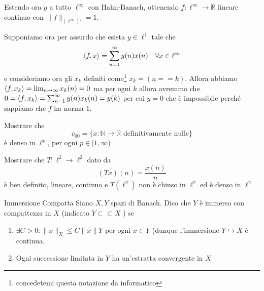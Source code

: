     Estendo ora \(g\) a tutto \(\ell^{\infty}\) con Hahn-Banach, ottenendo \(f :
    \ell^{\infty} \to \mathbb{R}\) lineare continuo con \(\|f\|_{(\ell^{\infty})'} = 1 \).

    Supponiamo ora per assurdo che esista \(y \in \ell^{1}\) tale che
    \[
      {\left\langle f, x\right\rangle} = \sum_{n=1}^{\infty} y{(n)}x{(n)} \quad \forall x \in \ell^{\infty} 
    \]
    e consideriamo ora gli \(x_k\) definiti come\footnote{concedetemi questa notazione da informatico} \(x_k = {(n == k)}\). Allora abbiamo \({\left\langle f, x_k\right\rangle} = \lim_{n \to \infty} x_k{(n)} = 0\) ma per ogni \(k\) allora avremmo che \\ \(0 = {\left\langle f, x_k\right\rangle} = \sum_{n=1}^{\infty} y{(n)}x_k{(n)} = y{(k)} \) per cui \(y = 0\) che è impossibile perché sappiamo che \(f\) ha norma 1.



\begin{eser}{}
    Mostrare che
    \[
        c_{00} = \{x : \mathbb{N}\to \mathbb{R} \text{ definitivamente nulle}\} 
    \]
    è denso in \(\ell^{p}\), per ogni \(p \in [1, \infty)\) 
\end{eser}

\begin{eser}{}
Mostrare che \(T : \ell^2 \to \ell^2\) dato da 
\[
  {(Tx)}{(n)} = \frac{x{(n)}}{n}
\]
è ben definito, lineare, continuo e \(T{(\ell^2)}\) non è chiuso in \(\ell^2\)
ed è denso in \(\ell^2\) 
    
\end{eser}\label{eser:Txn}

\begin{definition}{Immersione Compatta}
    Siano \(X, Y\) spazi di Banach. Dico che \(Y\) è immerso con compattezza in
    \(X\) (indicato \(Y \subset \subset  X\) ) se 
\begin{enumerate}[label = \arabic*.]
    \item \(\exists C > 0 : \|x\|_X \le C\|x\|Y\) per ogni \(x \in Y\) (dunque
        l'immersione \(Y \hookrightarrow X\) è continua.
    \item Ogni successione limitata in \(Y\) ha un'estratta convergente in \(X\) 
\end{enumerate}
\end{definition}

